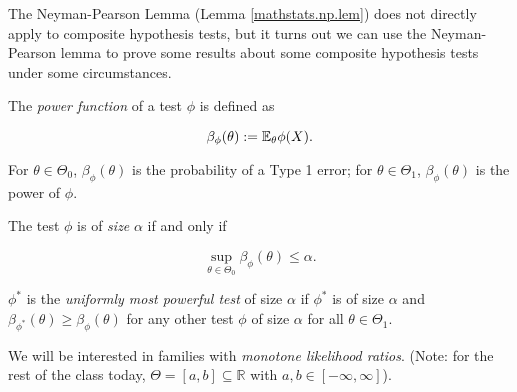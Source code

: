 The Neyman-Pearson Lemma (Lemma \ref{mathstats.np.lem}) does not directly apply to composite hypothesis tests, but it turns out we can use the Neyman-Pearson lemma to prove some results about some composite hypothesis tests under some circumstances.

\begin{definition}

The \textit{power function} of a test \(\phi\) is defined as

\[
\beta_\phi(\theta) := \E_\theta \phi(X).
\]

\end{definition}

\begin{remark}

For \(\theta \in \Theta_0\), \(\beta_\phi(\theta)\) is the probability of a Type 1 error; for \(\theta \in \Theta_1\), \(\beta_\phi(\theta)\) is the power of \(\phi\).

\end{remark}

\begin{definition}

The test \(\phi\) is of \textit{size} \(\alpha\) if and only if 

\[
\sup_{\theta \in \Theta_0} \beta_\phi(\theta) \leq \alpha.
\]

\end{definition}

\begin{definition}

\(\phi^*\) is the \textit{uniformly most powerful test} of size \(\alpha\) if \(\phi^*\) is of size \(\alpha\) and \(\beta_{\phi^*}(\theta) \geq \beta_\phi(\theta)\) for any other test \(\phi\) of size \(\alpha\) for all \(\theta \in \Theta_1\).

\end{definition}

We will be interested in families with \textit{monotone likelihood ratios}. (Note: for the rest of the class today, \(\Theta = [a, b] \subseteq \mathbb{R}\) with \(a, b \in [-\infty, \infty]\)). 

